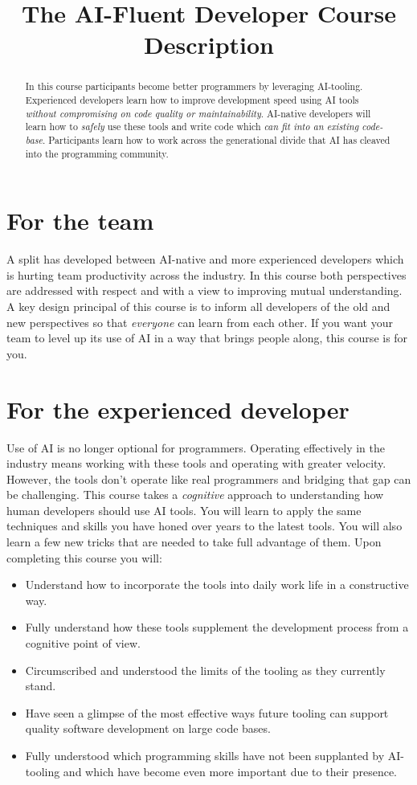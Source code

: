 \documentclass[twoside=false,DIV=14]{scrartcl}
\date{\vspace{-5em}}
\title{\color{blackish} \vspace{-1em} The AI-Fluent Developer Course Description}
\begin{document}
{\color{blackish}\maketitle}\vspace{-2em}

\begin{abstract}
    In this course participants become better programmers by leveraging AI-tooling. Experienced developers learn how to improve development speed using AI tools \emph{without compromising on code quality or maintainability}.  AI-native developers will learn how to \emph{safely} use these tools and write code which \emph{can fit into an existing code-base}.  Participants learn how to work across the generational divide that AI has cleaved into the programming community. 
\end{abstract}

\section{For the team}
A split has developed between AI-native and more experienced developers which is hurting team productivity across the industry.  In this course both perspectives are addressed with respect and with a view to improving mutual understanding.  A key design principal of this course is to inform all developers of the old and new perspectives so that \emph{everyone} can learn from each other. If you want your team to level up its use of AI in a way that brings people along, this course is for you.

\section{For the experienced developer}
Use of AI is no longer optional for programmers.  Operating effectively in the industry means working with these tools and operating with greater velocity.  However, the tools don't operate like real programmers and bridging that gap can be challenging.  This course takes a \emph{cognitive} approach to understanding how human developers should use AI tools.  You will learn to apply the same techniques and skills you have honed over years to the latest tools.  You will also learn a few new tricks that are needed to take full advantage of them. Upon completing this course you will:
\begin{itemize}
    \item Understand how to incorporate the tools into daily work life in a constructive way.
    \item Fully understand how these tools supplement the development process from a cognitive point of view.
    \item Circumscribed and understood the limits of the tooling as they currently stand.
    \item Have seen a glimpse of the most effective ways future tooling can support quality software development on large code bases.
    \item Fully understood which programming skills have not been supplanted by AI-tooling and which have become even more important due to their presence.
\end{itemize}
\end{document}
